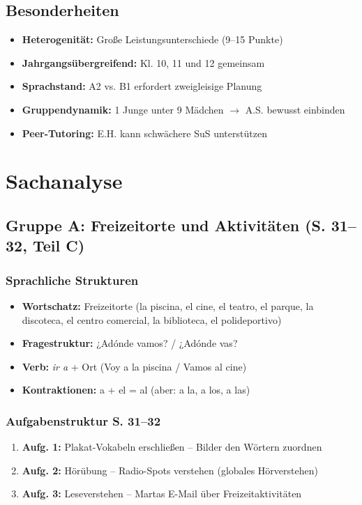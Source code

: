 \documentclass[11pt,a4paper]{article}
\begin{document}
\subsection{Besonderheiten}
\begin{itemize}
    \item \textbf{Heterogenität:} Große Leistungsunterschiede (9--15 Punkte)
    \item \textbf{Jahrgangsübergreifend:} Kl. 10, 11 und 12 gemeinsam
    \item \textbf{Sprachstand:} A2 vs. B1 erfordert zweigleisige Planung
    \item \textbf{Gruppendynamik:} 1 Junge unter 9 Mädchen $\rightarrow$ A.S. bewusst einbinden
    \item \textbf{Peer-Tutoring:} E.H. kann schwächere SuS unterstützen
\end{itemize}

\section{Sachanalyse}

\subsection{Gruppe A: Freizeitorte und Aktivitäten (S. 31--32, Teil C)}

\subsubsection{Sprachliche Strukturen}
\begin{itemize}
    \item \textbf{Wortschatz:} Freizeitorte (la piscina, el cine, el teatro, el parque, la discoteca, el centro comercial, la biblioteca, el polideportivo)
    \item \textbf{Fragestruktur:} ¿Adónde vamos? / ¿Adónde vas?
    \item \textbf{Verb:} \textit{ir a} + Ort (Voy a la piscina / Vamos al cine)
    \item \textbf{Kontraktionen:} a + el = al (aber: a la, a los, a las)
\end{itemize}

\subsubsection{Aufgabenstruktur S. 31--32}
\begin{enumerate}
    \item \textbf{Aufg. 1:} Plakat-Vokabeln erschließen -- Bilder den Wörtern zuordnen
    \item \textbf{Aufg. 2:} Hörübung -- Radio-Spots verstehen (globales Hörverstehen)
    \item \textbf{Aufg. 3:} Leseverstehen -- Martas E-Mail über Freizeitaktivitäten
\end{enumerate}
\end{document}
